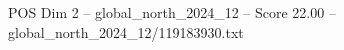 \begin{textsample}{POS Dim 2 – global\_north\_2024\_12 – Score 22.00 – global\_north\_2024\_12/119183930.txt}
\end{textsample}
